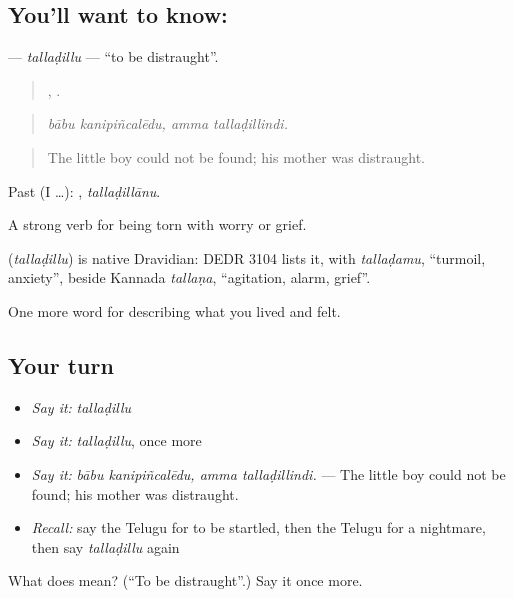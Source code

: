 \subsection*{You'll want to know: }
\textbf{} — \emph{tallaḍillu} — \textquotedblleft{}to be distraught\textquotedblright{}.

\begin{quote}
 ,  .
\end{quote}

\begin{quote}
\emph{bābu kanipiñcalēdu, amma tallaḍillindi.}
\end{quote}

\begin{quote}
The little boy could not be found; his mother was distraught.
\end{quote}

Past (I …): , \emph{tallaḍillānu}.

A strong verb for being torn with worry or grief.

\begin{cousinweb}
\textbf{} (\emph{tallaḍillu}) is native Dravidian: DEDR 3104 lists it, with \emph{tallaḍamu}, \textquotedblleft{}turmoil, anxiety\textquotedblright{}, beside Kannada \emph{tallaṇa}, \textquotedblleft{}agitation, alarm, grief\textquotedblright{}.
\end{cousinweb}

\begin{grammarlens}[title={What you've built}]
One more word for describing what you lived and felt.
\end{grammarlens}

\subsection*{Your turn}
\begin{itemize}
\raggedright
  \item \emph{Say it:} \emph{tallaḍillu}
  \item \emph{Say it:} \emph{tallaḍillu}, once more
  \item \emph{Say it:} \emph{bābu kanipiñcalēdu, amma tallaḍillindi.} — The little boy could not be found; his mother was distraught.
  \item \emph{Recall:} say the Telugu for to be startled, then the Telugu for a nightmare, then say \emph{tallaḍillu} again
\end{itemize}

\begin{tcolorbox}[breakable,colback=teal!4,colframe=teal!35!black,title={Before you move on}]
What does  mean? (\textquotedblleft{}To be distraught\textquotedblright{}.) Say it once more.
\end{tcolorbox}
